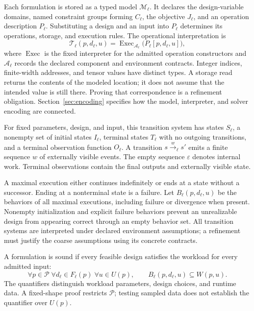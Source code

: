 \documentclass[11pt]{article}
\begin{document}
Each formulation is stored as a typed model $\mathcal M_\ell$. It declares the design-variable domains, named constraint groups forming $C_\ell$, the objective $J_\ell$, and an operation description $P_\ell$. Substituting a design and an input into $P_\ell$ determines its operations, storage, and execution rules. The operational interpretation is
\begin{equation}
 \mathcal T_\ell(p,d_\ell,u)
 =\operatorname{Exec}_{\mathcal A_\ell}\bigl(P_\ell[p,d_\ell,u]\bigr),
 \label{eq:interpretation}
\end{equation}
where $\operatorname{Exec}$ is the fixed interpreter for the admitted operation constructors and $\mathcal A_\ell$ records the declared component and environment contracts. Integer indices, finite-width addresses, and tensor values have distinct types. A storage read returns the contents of the modeled location; it does not assume that the intended value is still there. Proving that correspondence is a refinement obligation. Section~\ref{sec:encoding} specifies how the model, interpreter, and solver encoding are connected.

For fixed parameters, design, and input, this transition system has states $S_\ell$, a nonempty set of initial states $I_\ell$, terminal states $T_\ell$ with no outgoing transitions, and a terminal observation function $O_\ell$. A transition $s\xrightarrow{w}_\ell s'$ emits a finite sequence $w$ of externally visible events. The empty sequence $\varepsilon$ denotes internal work. Terminal observations contain the final outputs and externally visible state.

A maximal execution either continues indefinitely or ends at a state without a successor. Ending at a nonterminal state is a failure. Let $B_\ell(p,d_\ell,u)$ be the behaviors of all maximal executions, including failure or divergence when present. Nonempty initialization and explicit failure behaviors prevent an unrealizable design from appearing correct through an empty behavior set. All transition systems are interpreted under declared environment assumptions; a refinement must justify the coarse assumptions using its concrete contracts.

A formulation is sound if every feasible design satisfies the workload for every admitted input:
\begin{equation}
 \forall p\in\mathcal P\;\forall d_\ell\in F_\ell(p)\;\forall u\in U(p),\qquad
 B_\ell(p,d_\ell,u)\subseteq W(p,u).
 \label{eq:sound}
\end{equation}
The quantifiers distinguish workload parameters, design choices, and runtime data. A fixed-shape proof restricts $\mathcal P$; testing sampled data does not establish the quantifier over $U(p)$.
\end{document}
